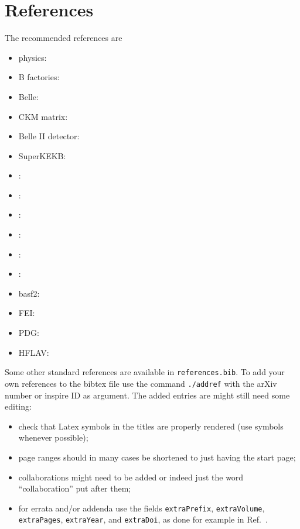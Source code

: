 \section{References}
The recommended references are
\begin{itemize}
\item \belletwo physics: \cite{Kou:2018nap}
\item B factories: \cite{Bevan:2014iga}
\item Belle: \cite{Brodzicka:2012jm}
\item CKM matrix: \cite{Kobayashi:1973fv}
\item Belle II detector: \cite{Abe:2010gxa}
\item SuperKEKB: \cite{Akai:2018mbz}
\item \evtgen: \cite{Lange:2001uf}
\item \pythia: \cite{Sjostrand:2014zea}
\item \kkmc: \cite{Jadach:1999vf}
\item \tauola: \cite{Jadach:1990mz}
\item \photos: \cite{Barberio:1990ms}
\item \geant: \cite{Agostinelli:2002hh}
\item basf2: \cite{Kuhr:2018lps}
\item FEI: \cite{Keck:2018lcd}
\item PDG: \cite{Zyla:2020zbs}
\item HFLAV: \cite{Amhis:2019ckw}
\end{itemize}
Some other standard references are available in \texttt{references.bib}. To add your own references to the bibtex file use the command \texttt{./addref} with the arXiv number or inspire ID as argument.  The added entries are might still need some editing:
\begin{itemize}
\item check that Latex symbols in the titles are properly rendered (use \belletwo symbols whenever possible);
\item page ranges should in many cases be shortened to just  having the start page;
\item collaborations might need to be added or indeed just the word  ``collaboration'' put after them;
\item for errata and/or addenda use the fields \texttt{extraPrefix}, \texttt{extraVolume}, \texttt{extraPages}, \texttt{extraYear}, and \texttt{extraDoi}, as done for example in Ref.~\cite{Kou:2018nap}.

\end{itemize}

